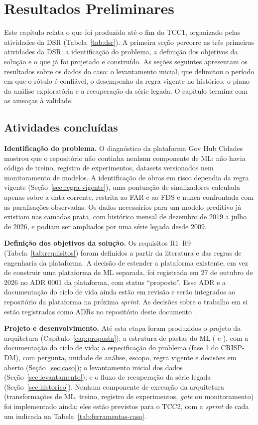 \chapter[Resultados Preliminares]{Resultados Preliminares}
\label{cap:resultados}

Este capítulo relata o que foi produzido até o fim do TCC1, organizado pelas atividades da DSR (Tabela~\ref{tab:dsr}). A primeira seção percorre as três primeiras atividades da DSR: a identificação do problema, a definição dos objetivos da solução e o que já foi projetado e construído. As seções seguintes apresentam os resultados sobre os dados do caso: o levantamento inicial, que delimitou o período em que o rótulo é confiável, o desempenho da regra vigente no histórico, o plano da análise exploratória e a recuperação da série legada. O capítulo termina com as ameaças à validade.

\section{Atividades concluídas}

\textbf{Identificação do problema.} O diagnóstico da plataforma Gov Hub Cidades mostrou que o repositório não continha nenhum componente de ML: não havia código de treino, registro de experimentos, datasets versionados nem monitoramento de modelos. A identificação de obras em risco dependia da regra vigente (Seção~\ref{sec:regra-vigente}), uma pontuação de sinalizadores calculada apenas sobre a data corrente, restrita ao FAR e ao FDS e nunca confrontada com as paralisações observadas. Os dados necessários para um modelo preditivo já existiam nas camadas prata, com histórico mensal de dezembro de 2019 a julho de 2026, e podiam ser ampliados por uma série legada desde 2009.

\textbf{Definição dos objetivos da solução.} Os requisitos R1--R9 (Tabela~\ref{tab:requisitos}) foram definidos a partir da literatura e das regras de engenharia da plataforma. A decisão de estender a plataforma existente, em vez de construir uma plataforma de ML separada, foi registrada em 27 de outubro de 2026 no ADR 0001 da plataforma, com status ``proposto''. Esse ADR e a documentação do ciclo de vida ainda estão em revisão e serão integrados ao repositório da plataforma \cite{govhubcidades} na próxima \textit{sprint}. As decisões sobre o trabalho em si estão registradas como ADRs no repositório deste documento \cite{repositoriotcc}.

\textbf{Projeto e desenvolvimento.} Até esta etapa foram produzidos o projeto da arquitetura (Capítulo~\ref{cap:proposta}); a estrutura de pastas do ML ( e ), com a documentação do ciclo de vida; a especificação do problema (fase 1 do CRISP-DM), com pergunta, unidade de análise, escopo, regra vigente e decisões em aberto (Seção~\ref{sec:caso}); o levantamento inicial dos dados (Seção~\ref{sec:levantamento}); e o fluxo de recuperação da série legada (Seção~\ref{sec:historico}). Nenhum componente de execução da arquitetura (transformações de ML, treino, registro de experimentos, \textit{gate} ou monitoramento) foi implementado ainda; eles estão previstos para o TCC2, com a \textit{sprint} de cada um indicada na Tabela~\ref{tab:ferramentas-caso}.


